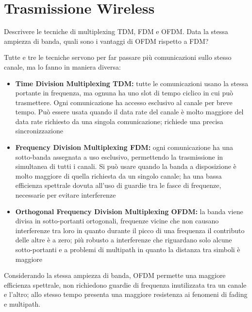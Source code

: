 \section{Trasmissione Wireless}

\begin{questions}
    \question Descrivere le tecniche di multiplexing TDM, FDM e OFDM. Data la stessa ampiezza di banda, quali sono i vantaggi di OFDM rispetto a FDM?
    
    \begin{solution}
        Tutte e tre le tecniche servono per far passare più comunicazioni sullo stesso canale, ma lo fanno in maniera diversa: 
        \begin{itemize}
            \item \textbf{Time Division Multiplexing TDM:} tutte le comunicazioni usano la stessa portante in frequenza, ma ognuna ha uno slot di tempo ciclico in cui può trasmettere. Ogni comunicazione ha accesso esclusivo al canale per breve tempo. Può essere usata quando il data rate del canale è molto maggiore del data rate richiesto da una singola comunicazione; richiede una precisa sincronizzazione
            
            \item \textbf{Frequency Division Multiplexing FDM:} ogni comunicazione ha una sotto-banda assegnata a uso esclusivo, permettendo la trasmissione in simultanea di tutti i canali. Si può usare quando la banda a disposizione è molto maggiore di quella richiesta da un singolo canale; ha una bassa efficienza spettrale dovuta all'uso di guardie tra le fasce di frequenze, necessarie per evitare interferenze
            
            \item \textbf{Orthogonal Frequency Division Multiplexing OFDM:} la banda viene divisa in sotto-portanti ortogonali, frequenze vicine che non causano interferenze tra loro in quanto durante il picco di una frequenza il contributo delle altre è a zero; più robusto a interferenze che riguardano solo alcune sotto-portanti e a problemi di multipath in quanto la distanza tra simboli è maggiore
        \end{itemize}
        
        Considerando la stessa ampiezza di banda, OFDM permette una maggiore efficienza spettrale, non richiedono guardie di frequenza inutilizzata tra un canale e l'altro; allo stesso tempo presenta una maggiore resistenza ai fenomeni di fading e multipath.
    \end{solution}
    

\end{questions}
